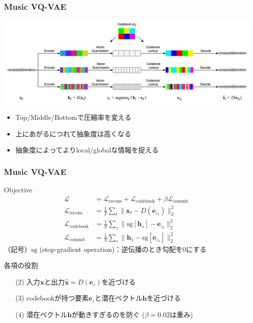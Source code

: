 \documentclass[dvipdfmx]{beamer}
\begin{document}
\begin{frame}
    \frametitle{Music VQ-VAE}
    \begin{center}
        \includegraphics[scale=0.2]{figure/musicvqvae.png}
    \end{center}

    \begin{itemize}
        \item Top/Middle/Bottomで圧縮率を変える
        \item 上にあがるにつれて抽象度は高くなる
        \item 抽象度によってよりlocal/globalな情報を捉える
    \end{itemize}
\end{frame}


\begin{frame}
    \frametitle{Music VQ-VAE}
    Objective
    \begin{align}
        \mathcal{L} &= \mathcal{L}_{\mathrm{recons}} + \mathcal{L}_{\mathrm{codebook}} + \beta \mathcal{L}_{\mathrm{commit}}\\
        \mathcal{L}_{\mathrm{recons}} &= \frac{1}{T} \sum_{t} \| \bm{x}_t - D(\bm{e}_{z_t})\|_2^2\\
        \mathcal{L}_{\mathrm{codebook}} &= \frac{1}{S} \sum_{s} \| \mathrm{sg}\left[\bm{h}_s\right] - \bm{e}_{z_t} \|_2^2\\
        \mathcal{L}_{\mathrm{commit}} &= \frac{1}{S} \sum_{s} \| \bm{h}_s - \mathrm{sg}\left[\bm{e}_{z_s}\right] \|_2^2
    \end{align}
    （記号）$\mathrm{sg}$ (stop-gradient operation)：逆伝播のとき勾配を0にする
    \vspace{\baselineskip}

    各項の役割
    \begin{itemize}
        \item[(2)] 入力$\bm{x}$と出力$\hat{\bm{x}}=D(\bm{e}_z)$を近づける
        \item[(3)] codebookが持つ要素$\bm{e}_z$と潜在ベクトル$\bm{h}$を近づける
        \item[(4)] 潜在ベクトル$\bm{h}$が動きすぎるのを防ぐ ($\beta=0.02$は重み)
    \end{itemize}
\end{frame}
\end{document}

